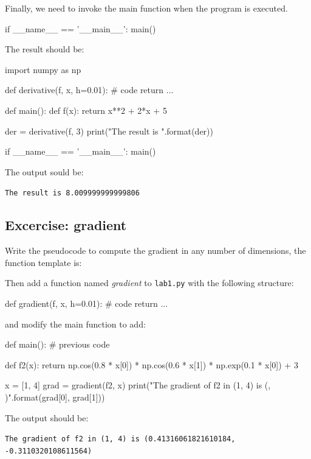 Finally, we need to invoke the main function when the program is executed.
\begin{python}
if __name__ == '__main__':
    main()
\end{python}

The result should be:
\begin{python}
import numpy as np

def derivative(f, x, h=0.01):
    # code
    return ...

def main():
    def f(x):
        return x**2 + 2*x + 5
    
    der = derivative(f, 3)
    print("The result is {}".format(der))

if __name__ == '__main__':
    main()
\end{python}

The output sould be:
\begin{adjustwidth}{1cm}{}
    \texttt{The result is 8.009999999999806}
\end{adjustwidth}


\subsection{Excercise: gradient}

Write the pseudocode to compute the gradient in any number of dimensions, the function template is:
\begin{algorithm}
\end{algorithm}

Then add a function named \textit{gradient} to \texttt{lab1.py} with the following structure:
\begin{python}
def gradient(f, x, h=0.01):
    # code
    return ...
\end{python}

and modify the main function to add:
\begin{python}
def main():
    # previous code

    def f2(x):
        return np.cos(0.8 * x[0]) * np.cos(0.6 * x[1]) * np.exp(0.1 * x[0]) + 3

    x = [1, 4]
    grad = gradient(f2, x)
    print("The gradient of f2 in (1, 4) is ({}, {})".format(grad[0], grad[1]))
\end{python}

The output should be:
\begin{adjustwidth}{1cm}{}
    \texttt{The gradient of f2 in (1, 4) is (0.41316061821610184, -0.3110320108611564)}
\end{adjustwidth}
